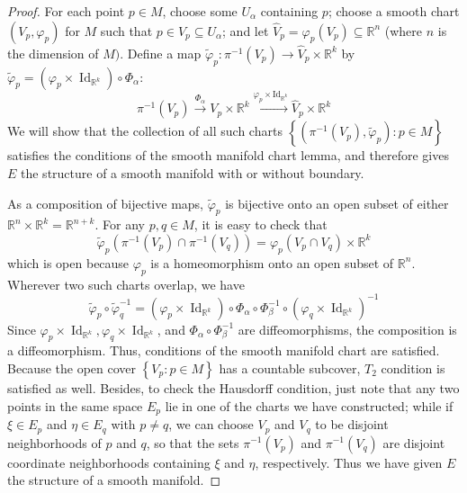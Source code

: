 \documentclass{ctexart}
\begin{document}
\begin{proof}[Proof]
  For each point $p \in M$, choose some $U_\alpha$ containing $p$; choose a smooth chart $\left(V_p, \varphi_p\right)$ for $M$ 
  such that $p \in V_p \subseteq U_\alpha$; and let $\widehat{V}_p=\varphi_p\left(V_p\right) \subseteq \mathbb{R}^n$
  (where $n$ is the dimension of $M)$. Define a map $\widetilde{\varphi}_p: \pi^{-1}\left(V_p\right) \rightarrow \widehat{V}_p \times \mathbb{R}^k$ by 
  $\widetilde{\varphi}_p=\left(\varphi_p \times \operatorname{Id}_{\mathbb{R}^k}\right) \circ\Phi_\alpha:$
  $$
  \pi^{-1}\left(V_p\right) \stackrel{\Phi_\alpha}{\longrightarrow} V_p \times \mathbb{R}^k \stackrel{\varphi_p \times \mathrm{Id}_{\mathbb{R}^k}}{\longrightarrow} 
  \widehat{V}_p \times \mathbb{R}^k
  $$
  We will show that the collection of all such charts $\left\{\left(\pi^{-1}\left(V_p\right), \tilde{\varphi}_p\right): p \in M\right\}$ satisfies 
  the conditions of the smooth manifold chart lemma, and therefore gives $E$ the structure of a smooth manifold with or without boundary.

  As a composition of bijective maps, $\tilde{\varphi}_p$ is bijective onto an open subset of either $\mathbb{R}^n \times \mathbb{R}^k=\mathbb{R}^{n+k}$. 
  For any $p, q \in M$, it is easy to check that
  $$
  \tilde{\varphi}_p\left(\pi^{-1}\left(V_p\right) \cap \pi^{-1}\left(V_q\right)\right)=\varphi_p\left(V_p \cap V_q\right) \times \mathbb{R}^k
  $$
  which is open because $\varphi_p$ is a homeomorphism onto an open subset of $\mathbb{R}^n$. Wherever two such charts overlap, we have
  $$
  \tilde{\varphi}_p \circ \widetilde{\varphi}_q^{-1}
  =\left(\varphi_p \times \operatorname{Id}_{\mathbb{R}^k}\right) \circ \Phi_\alpha \circ \Phi_\beta^{-1} \circ\left(\varphi_q \times \operatorname{Id}_{\mathbb{R}^k}\right)^{-1}
  $$
  Since $\varphi_p \times \operatorname{Id}_{\mathbb{R}^k}, \varphi_q \times \operatorname{Id}_{\mathbb{R}^k}$, 
  and $\Phi_\alpha \circ \Phi_\beta^{-1}$ are diffeomorphisms, the composition is a diffeomorphism. Thus, conditions of the smooth manifold chart are satisfied. 
  Because the open cover $\left\{V_p: p \in M\right\}$ has a countable subcover, $T_2$ condition is satisfied as well.
  Besides, to check the Hausdorff condition, just note that any two points in the same space $E_p$ lie in one of the charts we have constructed; 
  while if $\xi \in E_p$ and $\eta \in E_q$ with $p \neq q$, we can choose $V_p$ and $V_q$ to be disjoint neighborhoods of $p$ and $q$, 
  so that the sets $\pi^{-1}\left(V_p\right)$ and $\pi^{-1}\left(V_q\right)$ are disjoint coordinate neighborhoods containing $\xi$ and $\eta$, respectively. 
  Thus we have given $E$ the structure of a smooth manifold.


\end{proof}
\end{document}
